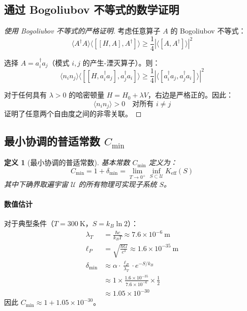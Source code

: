 \documentclass[11pt,a4paper]{article}
\newtheorem{definition}{定义}
\begin{document}
	\subsection{通过 Bogoliubov 不等式的数学证明}
	
	\begin{proof}[使用 Bogoliubov 不等式的严格证明]
		考虑任意算子 $A$ 的 Bogoliubov 不等式：
		\begin{equation}
			\langle A^\dagger A \rangle \langle [[H, A], A^\dagger] \rangle \geq \frac{1}{4} |\langle [A, A^\dagger] \rangle|^2
		\end{equation}
		
		选择 $A = a_i^\dagger a_j$（模式 $i,j$ 的产生-湮灭算子）。则：
		\begin{equation}
			\langle n_i n_j \rangle \langle [[H, a_i^\dagger a_j], a_j^\dagger a_i] \rangle \geq \frac{1}{4} |\langle [a_i^\dagger a_j, a_j^\dagger a_i] \rangle|^2
		\end{equation}
		
		对于任何具有 $\lambda > 0$ 的哈密顿量 $H = H_0 + \lambda V$，右边是严格正的。因此：
		\begin{equation}
			\langle n_i n_j \rangle > 0 \quad \text{对所有 } i \neq j
		\end{equation}
		证明了任意两个自由度之间的非零关联。
	\end{proof}
	
	\subsection{最小协调的普适常数 $C_{\min}$}
	
	\begin{definition}[最小协调的普适常数]
		基本常数 $C_{\min}$ 定义为：
		\begin{equation}
			C_{\min} = 1 + \delta_{\min} = \lim_{T \to 0^+} \inf_{S \subset \mathcal{U}} K_{\mathrm{eff}}(S)
		\end{equation}
		其中下确界取遍宇宙 $\mathcal{U}$ 的所有物理可实现子系统 $S$。
	\end{definition}
	
	\paragraph{数值估计}
	对于典型条件（$T = 300\ \mathrm{K}$，$S = k_B \ln 2$）：
	\begin{align}
		\lambda_T &= \frac{\hbar c}{k_B T} \approx 7.6 \times 10^{-6}\ \mathrm{m} \\
		\ell_P &= \sqrt{\frac{\hbar G}{c^3}} \approx 1.6 \times 10^{-35}\ \mathrm{m} \\
		\delta_{\min} &\approx \alpha \cdot \frac{\ell_P}{\lambda_T} \cdot e^{-S/k_B} \\
		&\approx 1 \times \frac{1.6 \times 10^{-35}}{7.6 \times 10^{-6}} \times \frac{1}{2} \\
		&\approx 1.05 \times 10^{-30}
	\end{align}
	因此 $C_{\min} \approx 1 + 1.05 \times 10^{-30}$。
	
\end{document}
